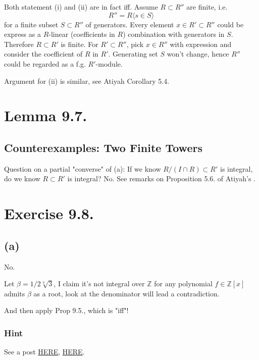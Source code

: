 Both statement (i) and (ii) are in fact iff.
Assume $R\subset R''$ are finite, i.e. \[R''=R\langle s\in S\rangle\] for a finite subset $S\subset R''$ of generators. Every element $x\in R'\subset R''$ could be express as a $R$-linear (coefficients in $R$) combination with generators in $S$. Therefore $R\subset R'$ is finite. For $R'\subset R''$, pick $x\in R''$ with expression and consider the coefficient of $R$ in $R'$. Generating set $S$ won't change, hence $R''$ could be regarded as a f.g. $R'$-module.

Argument for (ii) is similar, see Atiyah \cite{atiyah1994introduction} Corollary 5.4.

\section{Lemma 9.7.}

\subsection{Counterexamples: Two Finite Towers}

Question on a partial "converse" of (a): If we know $R/(I\cap R)\subset R'$ is integral, do we know $R\subset R'$ is integral? No. See remarks on Proposition 5.6. of Atiyah's \cite{atiyah1994introduction}.

\section{Exercise 9.8.}

\subsection{(a)}

No.

Let $\beta=1/2\sqrt[3]{3}$, I claim it's not integral over $\mathbb Z$ for any polynomial $f\in \mathbb Z[x]$ admits $\beta$ as a root, look at the denominator will lead a contradiction.

And then apply Prop 9.5., which is "iff"!

\subsubsection{Hint}

See a post \href{https://math.stackexchange.com/questions/3770156/sqrt2-sqrt2-frac12-sqrt33-is-not-integral-over-mathbbz-s}{HERE}, \href{https://math.stackexchange.com/questions/2187396/checking-whether-a-given-element-is-integral-over-mathbbz}{HERE}.